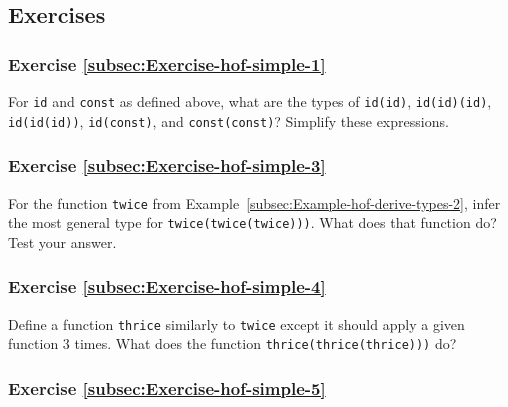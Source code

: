 \subsection{Exercises}

\subsubsection{Exercise \label{subsec:Exercise-hof-simple-1}\ref{subsec:Exercise-hof-simple-1}}

For \lstinline!id! and
\lstinline!const! as defined
above, what are the types of \lstinline!id(id)!,
\lstinline!id(id)(id)!,
\lstinline!id(id(id))!,
\lstinline!id(const)!,
and \lstinline!const(const)!?
Simplify these expressions.

\subsubsection{Exercise \label{subsec:Exercise-hof-simple-3}\ref{subsec:Exercise-hof-simple-3}}

For the function \lstinline!twice!
from Example~\ref{subsec:Example-hof-derive-types-2}, infer the
most general type for \lstinline!twice(twice(twice)))!.
What does that function do? Test your answer.

\subsubsection{Exercise \label{subsec:Exercise-hof-simple-4}\ref{subsec:Exercise-hof-simple-4}}

Define a function \lstinline!thrice!
similarly to \lstinline!twice!
except it should apply a given function $3$ times. What does the
function \lstinline!thrice(thrice(thrice)))!
do?

\subsubsection{Exercise \label{subsec:Exercise-hof-simple-5}\ref{subsec:Exercise-hof-simple-5}}

